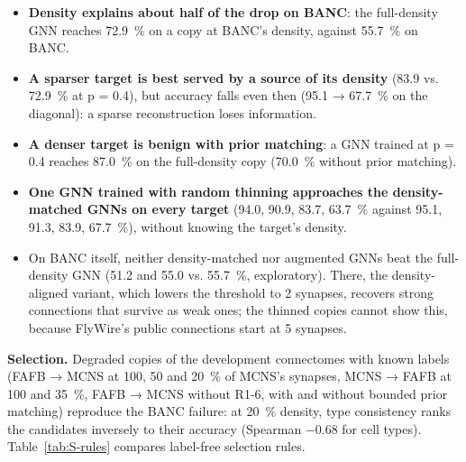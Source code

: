 \documentclass[11pt,a4paper]{article}
\begin{document}
\begin{itemize}[leftmargin=*,itemsep=2pt]

\item \textbf{Density explains about half of the drop on BANC}: the full-density GNN reaches 72.9~\% on a copy at BANC's density, against 55.7~\% on BANC.

\item \textbf{A sparser target is best served by a source of its density} (83.9 vs. 72.9~\% at p = 0.4), but accuracy falls even then (95.1 → 67.7~\% on the diagonal): a sparse reconstruction loses information.

\item \textbf{A denser target is benign with prior matching}: a GNN trained at p = 0.4 reaches 87.0~\% on the full-density copy (70.0~\% without prior matching).

\item \textbf{One GNN trained with random thinning approaches the density-matched GNNs on every target} (94.0, 90.9, 83.7, 63.7~\% against 95.1, 91.3, 83.9, 67.7~\%), without knowing the target's density.

\item On BANC itself, neither density-matched nor augmented GNNs beat the full-density GNN (51.2 and 55.0 vs. 55.7~\%, exploratory). There, the density-aligned variant, which lowers the threshold to 2 synapses, recovers strong connections that survive as weak ones; the thinned copies cannot show this, because FlyWire's public connections start at 5 synapses.

\end{itemize}

\textbf{Selection.} Degraded copies of the development connectomes with known labels (FAFB → MCNS at 100, 50 and 20~\% of MCNS's synapses, MCNS → FAFB at 100 and 35~\%, FAFB → MCNS without R1-6, with and without bounded prior matching) reproduce the BANC failure: at 20~\% density, type consistency ranks the candidates inversely to their accuracy (Spearman −0.68 for cell types). Table~\ref{tab:S-rules} compares label-free selection rules.
\end{document}

